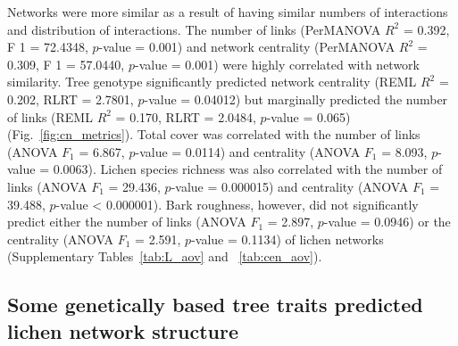 \documentclass[9pt,twocolumn,twoside,lineno]{pnas-new}
\begin{document}
{%





Networks were more similar as a result of having similar numbers of
interactions and distribution of interactions. The number of links
(PerMANOVA $R^2$ = 0.392, F 1 = 72.4348, $p$-value = 0.001) and
network centrality (PerMANOVA $R^2$ = 0.309, F 1 = 57.0440, $p$-value
= 0.001) were highly correlated with network similarity.  Tree
genotype significantly predicted network centrality (REML $R^2$ =
0.202, RLRT = 2.7801, $p$-value = 0.04012) but marginally predicted
the number of links (REML $R^2$ = 0.170, RLRT = 2.0484, $p$-value =
0.065) (Fig.~\ref{fig:cn_metrics}). Total cover was correlated with
the number of links (ANOVA $F_1$ = 6.867, $p$-value = 0.0114) and
centrality (ANOVA $F_1$ = 8.093, $p$-value = 0.0063). Lichen species
richness was also correlated with the number of links (ANOVA $F_1$ =
29.436, $p$-value = 0.000015) and centrality (ANOVA $F_1$ = 39.488,
$p$-value < 0.000001). Bark roughness, however, did not significantly
predict either the number of links (ANOVA $F_1$ = 2.897, $p$-value =
0.0946) or the centrality (ANOVA $F_1$ = 2.591, $p$-value = 0.1134) of
lichen networks (Supplementary Tables~\ref{tab:L_aov} and
~\ref{tab:cen_aov}).


\subsection{Some genetically based tree traits predicted lichen
  network structure}

}
\end{document}

